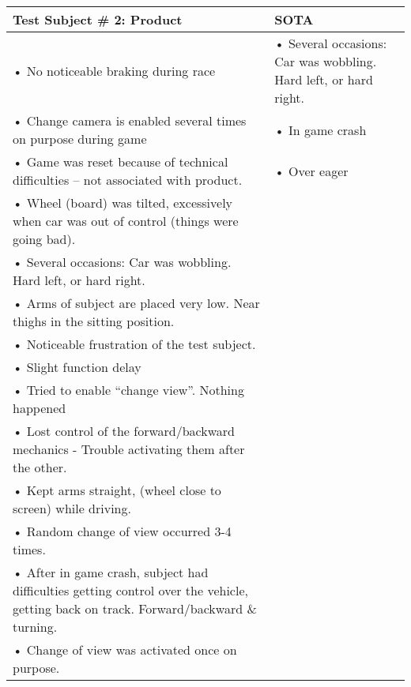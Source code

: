 \begin{table}[!htbp]
\begin{tabular}{| p{3.4in} | p{2in} |}
\textbf{Test Subject \# 2: Product} & \textbf{SOTA}\\
\hline
\cellcolor{NotGreenYellow}•	No noticeable braking during race & \cellcolor{NotOrange}•	Several occasions: Car was wobbling. Hard left, or hard right.\\
\cellcolor{NotSkyBlue}•	Change camera is enabled several times on purpose during game & \cellcolor{NotGreen}•	In game crash\\
\cellcolor{NotGreen}•	Game was reset because of technical difficulties – not associated with product. & \cellcolor{NotRed}•	Over eager\\
\cellcolor{NotRed}•	Wheel (board) was tilted, excessively when car was out of control (things were going bad). & \\
\cellcolor{NotOrange}•	Several occasions: Car was wobbling. Hard left, or hard right. & \\
\cellcolor{NotRed}•	Arms of subject are placed very low. Near thighs in the sitting position. & \\
\cellcolor{NotRed}•	Noticeable frustration of the test subject. & \\
\cellcolor{NotLavender}•	Slight function delay & \\
\cellcolor{NotSkyBlue}•	Tried to enable “change view”. Nothing happened & \\
\cellcolor{NotGreenYellow}•	Lost control of the forward/backward mechanics  - Trouble activating them after the other. & \\
\cellcolor{NotRed}•	Kept arms straight, (wheel close to screen) while driving. & \\
\cellcolor{NotSkyBlue}•	Random change of view occurred 3-4 times. & \\
\cellcolor{NotRed}•	After in game crash, subject had difficulties getting control over the vehicle, getting back on track. Forward/backward \& turning. & \\
\cellcolor{NotSkyBlue}•	Change of view was activated once on purpose. & \\
\end{tabular}
\end{table}